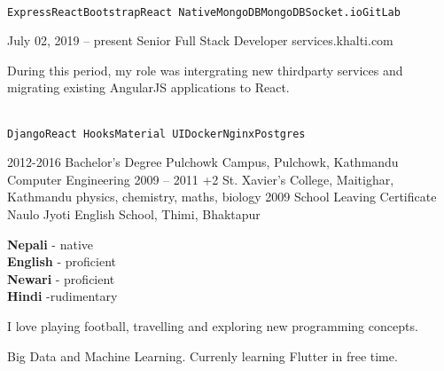 \documentclass[9pt]{developercv} %
\begin{document}
\begin{entrylist}
{		
		\\ \texttt{Express}\slashsep\texttt{React}\slashsep\texttt{Bootstrap}\slashsep\texttt{React Native}\slashsep\texttt{MongoDB}\slashsep\texttt{MongoDB}\slashsep\texttt{Socket.io}\slashsep\texttt{GitLab}}
		
		
	  \entry
		 {July 02, 2019 -- present}
		{Senior Full Stack Developer}
		{services.khalti.com}
		{
		During this period, my role was intergrating new thirdparty services and migrating existing AngularJS applications to React.
		
		\\ \texttt{Django}\slashsep\texttt{React Hooks}\slashsep\texttt{Material UI}\slashsep\texttt{Docker}\slashsep\texttt{Nginx}\slashsep\texttt{Postgres}}
\end{entrylist}



\begin{entrylist}
	\entry
		{2012-2016}
		{Bachelor's Degree}
		{Pulchowk Campus, Pulchowk, Kathmandu}
		{Computer Engineering}
	\entry
		{2009 -- 2011}
		{+2}
		{St. Xavier's College, Maitighar, Kathmandu}
		{physics, chemistry, maths, biology}
	\entry
		{2009}
		{School Leaving Certificate}
		{Naulo Jyoti English School, Thimi, Bhaktapur}
		{\lorem\lorem}
\end{entrylist}


\begin{minipage}[t]{0.3\textwidth}
	\vspace{-\baselineskip} %

	
	\textbf{Nepali} - native\\
	\textbf{English} - proficient\\
	\textbf{Newari} - proficient\\
	\textbf{Hindi} -rudimentary
\end{minipage}
\hfill
\begin{minipage}[t]{0.3\textwidth}
	\vspace{-\baselineskip} %
	
	
	I love playing football, travelling and exploring new programming concepts.
\end{minipage}
\hfill
\begin{minipage}[t]{0.3\textwidth}
	\vspace{-\baselineskip} %
	
	
	Big Data and Machine Learning. Currenly learning Flutter in free time.
\end{minipage}

\end{document}
